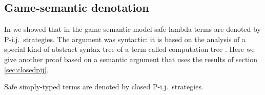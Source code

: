 \subsection{Game-semantic denotation}
In \cite{blumong:safelambdacalculus} we showed that in the game
semantic model safe lambda terms are denoted by P-i.j.\ strategies.
The argument was syntactic: it is based on the analysis of a special
kind of abstract syntax tree of a term called computation tree
\cite{OngLics2006}. Here we give another proof based on a semantic
argument that uses the results of section \ref{sec:closedpij}.


\begin{proposition}
\label{prop:safe_closepij_sem}
  Safe simply-typed terms are denoted by closed P-i.j.\ strategies.
\end{proposition}
